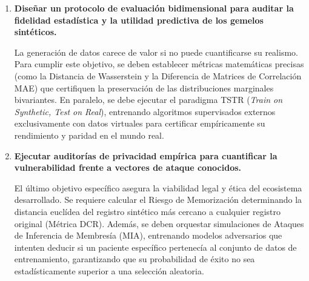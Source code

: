 \begin{enumerate}
  \item \textbf{Diseñar un protocolo de evaluación bidimensional para auditar la fidelidad estadística y la utilidad predictiva de los gemelos sintéticos.}
  
  La generación de datos carece de valor si no puede cuantificarse su realismo. Para cumplir este objetivo, se deben establecer métricas matemáticas precisas (como la Distancia de Wasserstein y la Diferencia de Matrices de Correlación MAE) que certifiquen la preservación de las distribuciones marginales bivariantes. En paralelo, se debe ejecutar el paradigma TSTR (\textit{Train on Synthetic, Test on Real}), entrenando algoritmos supervisados externos exclusivamente con datos virtuales para certificar empíricamente su rendimiento y paridad en el mundo real.

  \item \textbf{Ejecutar auditorías de privacidad empírica para cuantificar la vulnerabilidad frente a vectores de ataque conocidos.}
  
  El último objetivo específico asegura la viabilidad legal y ética del ecosistema desarrollado. Se requiere calcular el Riesgo de Memorización determinando la distancia euclídea del registro sintético más cercano a cualquier registro original (Métrica DCR). Además, se deben orquestar simulaciones de Ataques de Inferencia de Membresía (MIA), entrenando modelos adversarios que intenten deducir si un paciente específico pertenecía al conjunto de datos de entrenamiento, garantizando que su probabilidad de éxito no sea estadísticamente superior a una selección aleatoria.
\end{enumerate}
